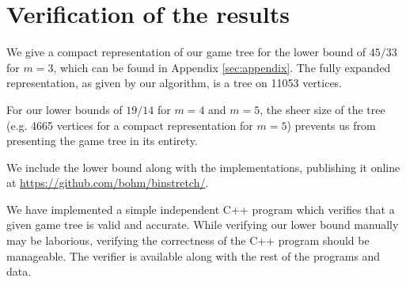 \section{Verification of the results}\label{sec:4:verification}


We give a compact representation of our game tree for the lower bound
of $45/33$ for $m=3$, which can be found in Appendix
\ref{sec:appendix}. The fully expanded representation, as given by our
algorithm, is a tree on 11053 vertices.

For our lower bounds of $19/14$ for $m=4$ and $m=5$, the sheer size of
the tree (e.g. 4665 vertices for a compact representation for $m = 5$) prevents us from
presenting the game tree in its entirety.

We include the lower bound along with the implementations, publishing
it online at
\url{https://github.com/bohm/binstretch/}.

We have implemented a simple independent C++ program which verifies
that a given game tree is valid and accurate. While verifying our
lower bound manually may be laborious, verifying the correctness of
the C++ program should be manageable. The verifier is available along
with the rest of the programs and data.